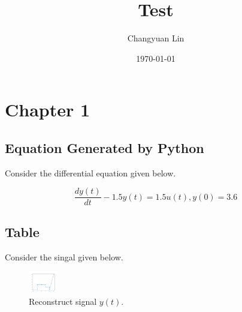\documentclass[11pt]{article}
\author{Changyuan Lin}
\date{\today}
\title{Test}
\newcommand{\aDE}[4]{\begin{center}\begin{equation}\label{#4}\frac{{dy(t)}}{{dt}} -#1y(t) = #2u(t),y(0) = #3 \end{equation}\end{center}}
\begin{document}
\maketitle
\tableofcontents



\section{Chapter 1}
\label{sec-1}
\subsection{Equation Generated by Python}
\label{sec-1-1}
Consider the differential equation given below.
\aDE{1.5}{1.5}{3.6}{eq1}
\subsection{Table}
\label{sec-1-2}
Consider the singal given below.

\begin{figure}[!htpb]
\centering
\includegraphics[width=0.5in]{plot.png}
\caption{\label{FIG:fig2}Reconstruct signal \(y(t)\).}
\end{figure}
\end{document}
